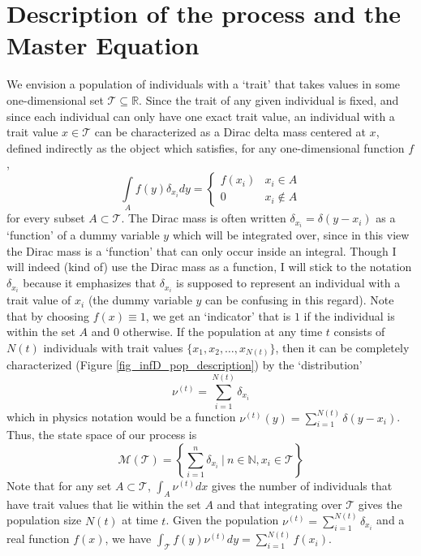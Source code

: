 \section{Description of the process and the Master Equation}
We envision a population of individuals with a `trait' that takes values in some one-dimensional set $\mathcal{T} \subseteq \mathbb{R}$. Since the trait of any given individual is fixed, and since each individual can only have one exact trait value, an individual with a trait value $x \in \mathcal{T}$ can be characterized as a Dirac delta mass centered at $x$, defined indirectly as the object which satisfies, for any one-dimensional function $f$,
\begin{equation*}
    \int\limits_{A}f(y)\delta_{x_i}dy = 
    \begin{cases}
        f(x_i) & x_i \in A\\
        0 &  x_i \notin A 
    \end{cases}
\end{equation*}
for every subset $A \subset \mathcal{T}$. The Dirac mass is often written $\delta_{x_i} = \delta(y-x_i)$ as a `function' of a dummy variable $y$ which will be integrated over, since in this view the Dirac mass is a `function' that can only occur inside an integral. Though I will indeed (kind of) use the Dirac mass as a function, I will stick to the notation $\delta_{x_i}$ because it emphasizes that $\delta_{x_i}$ is supposed to represent an individual with a trait value of $x_i$ (the dummy variable $y$ can be confusing in this regard). Note that by choosing $f(x) \equiv 1$, we get an `indicator' that is $1$ if the individual is within the set $A$ and $0$ otherwise. If the population at any time $t$ consists of $N(t)$ individuals with trait values $\{x_1,x_2,\ldots,x_{N(t)}\}$, then it can be completely characterized (Figure \ref{fig_infD_pop_description}) by the `distribution'
\begin{equation*}
    \nu^{(t)} = \sum\limits_{i=1}^{N(t)}\delta_{x_i}
\end{equation*}
which in physics notation would be a function $\nu^{(t)}(y) = \sum_{i=1}^{N(t)} \delta(y-x_i)$. Thus, the state space of our process is
\begin{equation*}
    \mathcal{M}(\mathcal{T})= \left\{\sum\limits_{i=1}^{n}\delta_{x_i} \ | \ n \in \mathbb{N}, x_i \in \mathcal{T}\right\}
\end{equation*}
Note that for any set $A \subset \mathcal{T}$, $\int_A\nu^{(t)}dx$ gives the number of individuals that have trait values that lie within the set $A$ and that integrating over $\mathcal{T}$ gives the population size $N(t)$ at time $t$. Given the population $\nu^{(t)} = \sum_{i=1}^{N(t)}\delta_{x_i}$ and a real function $f(x)$, we have $\int_{\mathcal{T}}f(y)\nu^{(t)}dy = \sum_{i=1}^{N(t)}f(x_i)$.
